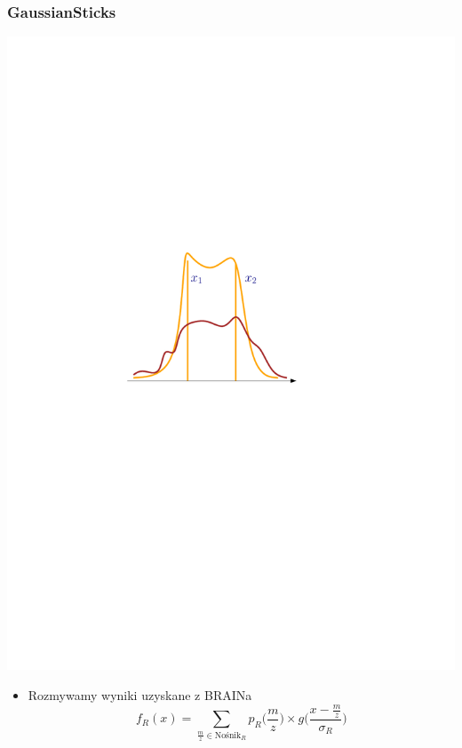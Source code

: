\documentclass[xetex]{beamer}
\begin{document}
	\begin{frame}\frametitle{GaussianSticks}
	    

	    \begin{center}
	        \includegraphics[height=.5\textheight,keepaspectratio]{./picts/sticks4}
	    \end{center}

		\begin{itemize}
			\item Rozmywamy wyniki uzyskane z BRAINa
			$$ f_R (x) = \sum_{\frac{m}{z} \in \text{Nośnik}_R} p_R \Big( \frac{m}{z} \Big) \times g \Biggl( \frac{x-\frac{m}{z}}{\sigma_R} \Biggl) $$
		\end{itemize}

	\end{frame}
\end{document}
